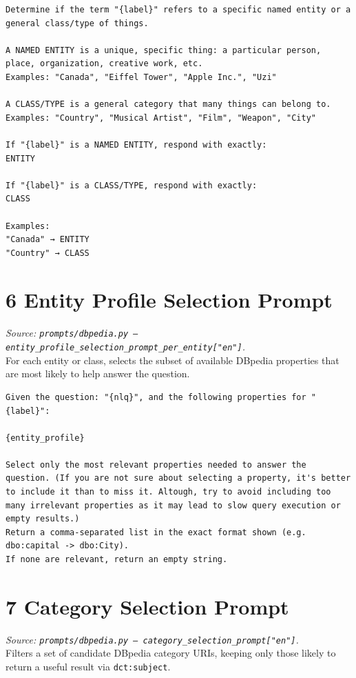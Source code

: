\documentclass[11pt,a4paper]{article}
\begin{document}
\begin{lstlisting}[style=prompt]
Determine if the term "{label}" refers to a specific named entity or a general class/type of things.

A NAMED ENTITY is a unique, specific thing: a particular person, place, organization, creative work, etc.
Examples: "Canada", "Eiffel Tower", "Apple Inc.", "Uzi"

A CLASS/TYPE is a general category that many things can belong to.
Examples: "Country", "Musical Artist", "Film", "Weapon", "City"

If "{label}" is a NAMED ENTITY, respond with exactly:
ENTITY

If "{label}" is a CLASS/TYPE, respond with exactly:
CLASS

Examples:
"Canada" → ENTITY
"Country" → CLASS
\end{lstlisting}

\section{6 \quad Entity Profile Selection Prompt}
\textit{Source: \texttt{prompts/dbpedia.py --- entity\_profile\_selection\_prompt\_per\_entity["en"]}.}\\
For each entity or class, selects the subset of available DBpedia properties that are most likely to help answer the question.

\begin{lstlisting}[style=prompt]
Given the question: "{nlq}", and the following properties for "{label}":

{entity_profile}

Select only the most relevant properties needed to answer the question. (If you are not sure about selecting a property, it's better to include it than to miss it. Altough, try to avoid including too many irrelevant properties as it may lead to slow query execution or empty results.)
Return a comma-separated list in the exact format shown (e.g. dbo:capital -> dbo:City).
If none are relevant, return an empty string.
\end{lstlisting}

\section{7 \quad Category Selection Prompt}
\textit{Source: \texttt{prompts/dbpedia.py --- category\_selection\_prompt["en"]}.}\\
Filters a set of candidate DBpedia category URIs, keeping only those likely to return a useful result via \texttt{dct:subject}.
\end{document}
